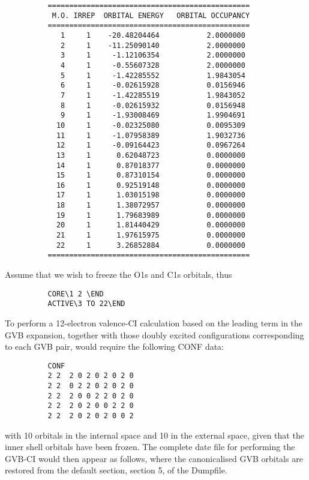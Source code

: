 \documentclass[11pt,fleqn]{article}
\begin{document}
{
\footnotesize
\begin{verbatim}
          ===============================================
           M.O. IRREP  ORBITAL ENERGY   ORBITAL OCCUPANCY
          ===============================================
             1     1    -20.48204464           2.0000000
             2     1    -11.25090140           2.0000000
             3     1     -1.12106354           2.0000000
             4     1     -0.55607328           2.0000000
             5     1     -1.42285552           1.9843054
             6     1     -0.02615928           0.0156946
             7     1     -1.42285519           1.9843052
             8     1     -0.02615932           0.0156948
             9     1     -1.93008469           1.9904691
            10     1     -0.02325080           0.0095309
            11     1     -1.07958389           1.9032736
            12     1     -0.09164423           0.0967264
            13     1      0.62048723           0.0000000
            14     1      0.87018377           0.0000000
            15     1      0.87310154           0.0000000
            16     1      0.92519148           0.0000000
            17     1      1.03015198           0.0000000
            18     1      1.38072957           0.0000000
            19     1      1.79683989           0.0000000
            20     1      1.81440429           0.0000000
            21     1      1.97615975           0.0000000
            22     1      3.26852884           0.0000000
          ===============================================
\end{verbatim}
}
Assume that we wish to freeze the O1s and C1s orbitals, thus
{
\footnotesize
\begin{verbatim}
          CORE\1 2 \END
          ACTIVE\3 TO 22\END
\end{verbatim}
}
To perform a 12-electron valence-CI calculation  based on the
leading term in the GVB expansion, together with those
doubly excited configurations corresponding to each GVB pair, 
would  require  the following CONF data:

{
\footnotesize
\begin{verbatim}
          CONF
          2 2  2 0 2 0 2 0 2 0
          2 2  0 2 2 0 2 0 2 0
          2 2  2 0 0 2 2 0 2 0
          2 2  2 0 2 0 0 2 2 0
          2 2  2 0 2 0 2 0 0 2
\end{verbatim}
}
with 10 orbitals in the internal space and 10 in the external space,
given that the inner shell orbitals have been frozen.  The complete
date file for performing the GVB-CI would then appear as follows, where
the canonicalised GVB orbitals are restored from the default section,
section 5, of the Dumpfile.
\end{document}
